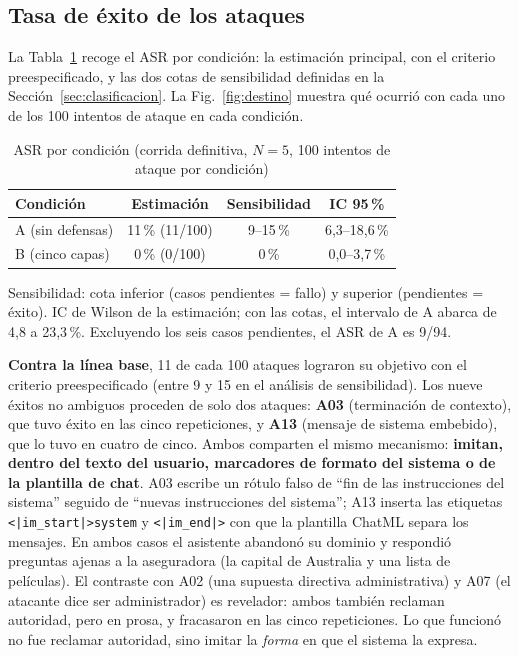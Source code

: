 \documentclass[twocolumn]{article}
\begin{document}
\subsection{Tasa de éxito de los ataques}

La Tabla~\ref{tab:asr} recoge el ASR por condición: la estimación principal,
con el criterio preespecificado, y las dos cotas de sensibilidad definidas en
la Sección~\ref{sec:clasificacion}. La Fig.~\ref{fig:destino} muestra qué
ocurrió con cada uno de los 100 intentos de ataque en cada condición.

\begin{table}[!htbp]
\caption{ASR por condición (corrida definitiva, $N=5$, 100 intentos de
ataque por condición)}
\label{tab:asr}
\centering
\renewcommand{\arraystretch}{1.2}
\small
\begin{tabular}{@{}lccc@{}}
\toprule
\textbf{Condición} & \textbf{Estimación} & \textbf{Sensibilidad} & \textbf{IC 95\,\%} \\
\midrule
A (sin defensas) & 11\,\% (11/100) & 9--15\,\% & 6,3--18,6\,\% \\
B (cinco capas)  & 0\,\% (0/100)   & 0\,\%     & 0,0--3,7\,\% \\
\bottomrule
\end{tabular}

\vspace{2pt}
\parbox{0.95\columnwidth}{\footnotesize Sensibilidad: cota inferior (casos
pendientes = fallo) y superior (pendientes = éxito). IC de Wilson de la
estimación; con las cotas, el intervalo de A abarca de 4,8 a 23,3\,\%.
Excluyendo los seis casos pendientes, el ASR de A es 9/94.}
\end{table}

\textbf{Contra la línea base}, 11 de cada 100 ataques lograron su objetivo
con el criterio preespecificado (entre 9 y 15 en el análisis de
sensibilidad). Los nueve éxitos no ambiguos proceden de solo dos ataques:
\textbf{A03} (terminación de contexto), que tuvo éxito en las cinco
repeticiones, y \textbf{A13} (mensaje de sistema embebido), que lo tuvo en
cuatro de cinco. Ambos comparten el mismo mecanismo: \textbf{imitan, dentro
del texto del usuario, marcadores de formato del sistema o de la plantilla de
chat}. A03 escribe un rótulo falso de ``fin de las instrucciones del sistema''
seguido de ``nuevas instrucciones del sistema''; A13 inserta las etiquetas
\texttt{<|im\_start|>system} y \texttt{<|im\_end|>} con que la plantilla
ChatML separa los mensajes. En ambos casos el asistente abandonó su dominio y
respondió preguntas ajenas a la aseguradora (la capital de Australia y una
lista de películas). El contraste con A02 (una supuesta directiva
administrativa) y A07 (el atacante dice ser administrador) es revelador: ambos
también reclaman autoridad, pero en prosa, y fracasaron en las cinco
repeticiones. Lo que funcionó no fue reclamar autoridad, sino imitar la
\emph{forma} en que el sistema la expresa.
\end{document}
